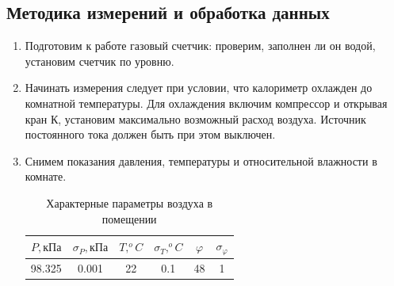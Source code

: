 \documentclass[12pt,a4paper]{article}
\begin{document}
\subsection*{Методика измерений и обработка данных}
\begin{enumerate}
    \item Подготовим к работе газовый счетчик: проверим, заполнен ли он водой, установим счетчик по уровню.
    
    \item Начинать измерения следует при условии, что калориметр охлажден до комнатной температуры. Для охлаждения включим компрессор и открывая кран К, установим максимально возможный расход воздуха. Источник постоянного тока должен быть при этом выключен.
    
    \item Снимем показания давления, температуры и относительной влажности в комнате.
    \begin{table}[ht!]
    \begin{center}
    \begin{tabular}{|c|c|c|c|c|c|}
    \hline
    $P, кПа$ & $\sigma_P, кПа$ & $T, ^oC$ & $\sigma_T, ^oC$ & $\varphi$ & $\sigma_\varphi$\\ \hline
           98.325 &   0.001& 22  &   0.1&  48 &1 
            \\ \hline
    \end{tabular}
    \caption{Характерные параметры воздуха в помещении}
    \end{center}
    \end{table}
    

\end{enumerate}
\end{document}
